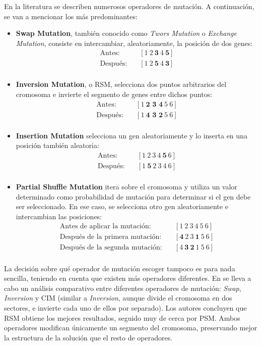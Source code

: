 En la literatura se describen numerosos operadores de mutación. A continuación, se van a mencionar los más predominantes:
\begin{itemize}
  \item \textbf{Swap Mutation}, también conocido como \textit{Twors Mutation} o \textit{Exchange Mutation}, consiste en 
  intercambiar, aleatoriamente, la posición de dos genes:
  \begin{align*}
  \text{Antes:}     &\quad [1\ 2\ \textbf{3}\ 4\ \textbf{5}] \\
  \text{Después:}   &\quad [1\ 2\ \textbf{5}\ 4\ \textbf{3}] \\
  \end{align*}
  \item \textbf{Inversion Mutation}, o \ac{RSM}, selecciona dos puntos arbitrarios del cromosoma e invierte el segmento de 
  genes entre dichos puntos:
  \begin{align*}
  \text{Antes:}     &\quad [1\ \textbf{2\ 3\ 4}\ 5\ 6] \\
  \text{Después:}   &\quad [1\ \textbf{4\ 3\ 2}\ 5\ 6] \\
  \end{align*}
  \item \textbf{Insertion Mutation} selecciona un gen aleatoriamente y lo inserta en una posición también aleatoria:
  \begin{align*}
  \text{Antes:}     &\quad [1\ 2\ 3\ 4\ \textbf{5}\ 6] \\
  \text{Después:}   &\quad [1\ \textbf{5}\ 2\ 3\ 4\ 6] \\
  \end{align*}
  \item \textbf{Partial Shuffle Mutation} itera sobre el cromosoma y utiliza un valor determinado como probabilidad 
  de mutación para determinar si el gen debe ser seleccionado. En ese caso, se selecciona otro gen aleatoriamente e 
  intercambian las posiciones:
  \begin{align*}
  \text{Antes de aplicar la mutación:}     &\quad [1\ 2\ 3\ 4\ 5\ 6] \\
  \text{Después de la primera mutación:}   &\quad [\textbf{4}\ 2\ 3\ \textbf{1}\ 5\ 6] \\
  \text{Después de la segunda mutación:}   &\quad [4\ \textbf{3}\ \textbf{2}\ 1\ 5\ 6] \\
  \end{align*}
\end{itemize}

La decisión sobre qué operador de mutación escoger tampoco es para nada sencilla, teniendo en cuenta que existen más operadores
diferentes. En \cite{abdoun2012} se lleva a cabo un análisis comparativo entre diferentes operadores de mutación: \textit{Swap},
\textit{Inversion} y \ac{CIM} (similar a \textit{Inversion}, aunque divide el cromosoma en dos sectores, e invierte cada uno
de ellos por separado). Los autores concluyen que RSM obtiene los mejores resultados, seguido muy de cerca por PSM. Ambos operadores 
modifican únicamente un segmento del cromosoma, preservando mejor la estructura de la solución que el resto de operadores. 

